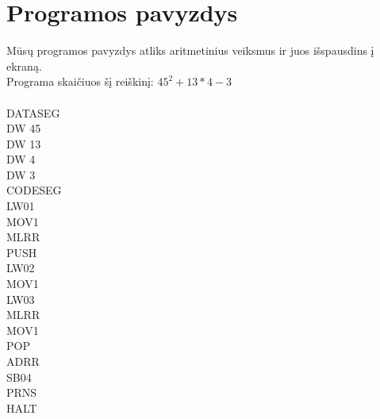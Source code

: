 \section{Programos pavyzdys}
	Mūsų programos pavyzdys atliks aritmetinius veiksmus ir juos išspausdins į ekraną.\\
	Programa skaičiuos šį reiškinį: \(45^2 + 13*4 - 3\)\\\\
	DATASEG\\
	DW 45\\
	DW 13\\
	DW 4\\
	DW 3\\
	CODESEG\\
	LW01\\
	MOV1\\
	MLRR\\
	PUSH\\
	LW02\\
	MOV1\\
	LW03\\
	MLRR\\
	MOV1\\
	POP\\
	ADRR\\
	SB04\\
	PRNS\\
	HALT\\